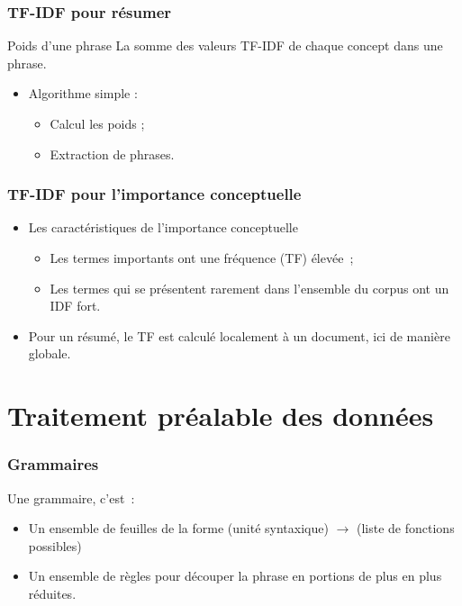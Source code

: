 \documentclass[12pt, handout]{beamer}
\begin{document}
\begin{frame}
 \frametitle{TF-IDF pour résumer}
  \begin{block}{Poids d'une phrase}
 	La somme des valeurs TF-IDF de chaque concept dans une phrase.
 \end{block}
 \begin{itemize}
  \item Algorithme simple :
  	\begin{itemize}
  	\item Calcul les poids ;
  	\item Extraction de phrases.
  	\end{itemize}
 \end{itemize}

 
\end{frame}

\begin{frame}
 \frametitle{TF-IDF pour l'importance conceptuelle}
 \begin{itemize}
  	\item Les caractéristiques de l'importance conceptuelle
  	\begin{itemize}
  		\item Les termes importants ont une fréquence (TF) élevée~;
 		\item Les termes qui se présentent rarement dans l'ensemble du corpus ont un IDF fort.
  	\end{itemize}
  	\item Pour un résumé, le TF est calculé localement à un document, ici de manière globale.
  \end{itemize}

  
\end{frame}


\section{Traitement préalable des données}


\begin{frame}
 \frametitle{Grammaires}
 Une grammaire, c'est~:
 \begin{itemize}
  \item Un ensemble de feuilles de la forme (unité syntaxique) $\rightarrow$ (liste de fonctions possibles)
  \item Un ensemble de règles pour découper la phrase en portions de plus en plus réduites.
 \end{itemize}
 
\end{frame}
\end{document}
